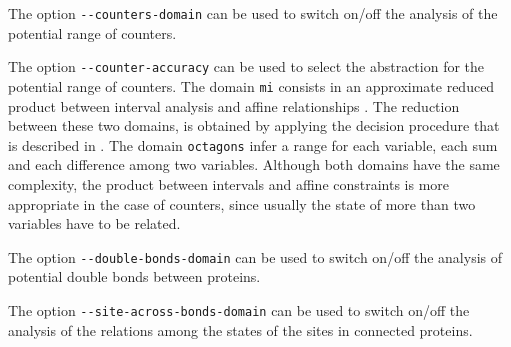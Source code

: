 \documentclass[11pt]{book}
\begin{document}
The option \verb?--counters-domain? can be used to switch on/off the analysis of the potential range of counters.

The option \verb?--counter-accuracy? can be used to select the abstraction for the potential range of counters. The domain \texttt{mi} consists in an approximate reduced product between interval analysis \cite{CousotCousot76-1} and affine relationships \cite{karr}. The reduction between these two domains, is obtained by applying the decision procedure that is described in \cite{feret:occurrence-counting}. The domain \texttt{octagons} infer a range for each variable, each sum and each difference among two variables. Although both domains have the same complexity, the product between intervals and affine constraints is more appropriate in the case of counters, since usually the state of more than two variables have to be related.

The option \verb?--double-bonds-domain? can be used to switch on/off the analysis of potential double bonds between proteins.

The option \verb?--site-across-bonds-domain? can be used to switch on/off the analysis of the relations among the states of the sites in connected proteins.
\end{document}
